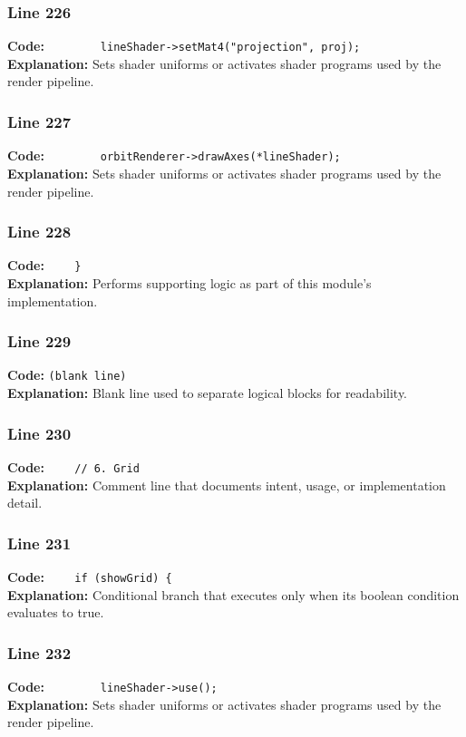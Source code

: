 \documentclass[11pt,a4paper]{article}
\begin{document}
\subsubsection*{Line 226}
\textbf{Code:} \verb|        lineShader->setMat4("projection", proj);|\\
\textbf{Explanation:} Sets shader uniforms or activates shader programs used by the render pipeline.

\subsubsection*{Line 227}
\textbf{Code:} \verb|        orbitRenderer->drawAxes(*lineShader);|\\
\textbf{Explanation:} Sets shader uniforms or activates shader programs used by the render pipeline.

\subsubsection*{Line 228}
\textbf{Code:} \verb|    }|\\
\textbf{Explanation:} Performs supporting logic as part of this module's implementation.

\subsubsection*{Line 229}
\textbf{Code:} \texttt{(blank line)}\\
\textbf{Explanation:} Blank line used to separate logical blocks for readability.

\subsubsection*{Line 230}
\textbf{Code:} \verb|    // 6. Grid|\\
\textbf{Explanation:} Comment line that documents intent, usage, or implementation detail.

\subsubsection*{Line 231}
\textbf{Code:} \verb|    if (showGrid) {|\\
\textbf{Explanation:} Conditional branch that executes only when its boolean condition evaluates to true.

\subsubsection*{Line 232}
\textbf{Code:} \verb|        lineShader->use();|\\
\textbf{Explanation:} Sets shader uniforms or activates shader programs used by the render pipeline.
\end{document}
